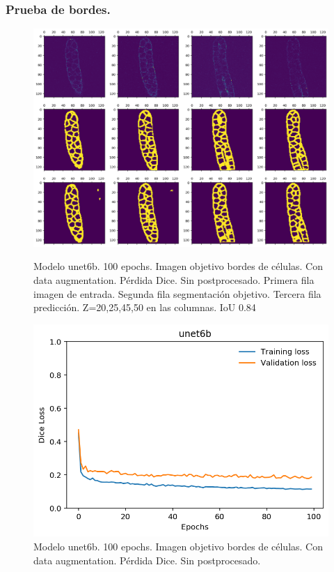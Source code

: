 \clearpage \subsubsection{Prueba de bordes.}
\begin{figure}[ht]
\centering
\includegraphics[scale=0.35]{img/unet6b-res.png} 
\caption{Modelo unet6b. 100 epochs. Imagen objetivo bordes de células. Con data augmentation. Pérdida Dice. Sin postprocesado. Primera fila imagen de entrada. Segunda fila segmentación objetivo. Tercera fila predicción. Z=20,25,45,50 en las columnas. IoU 0.84}\bigskip 
\includegraphics[scale=0.7]{img/unet6b-loss.png} 
\caption{Modelo unet6b. 100 epochs. Imagen objetivo bordes de células. Con data augmentation. Pérdida Dice. Sin postprocesado.}\bigskip 
\end{figure}

